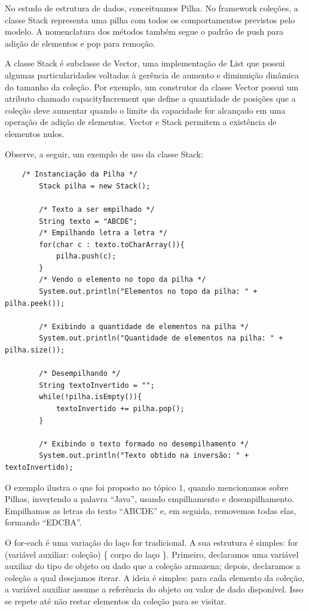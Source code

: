 \documentclass[11pt]{article}
\begin{document}
No estudo de estrutura de dados, conceituamos Pilha. No framework coleções, a classe Stack representa uma pilha com todos os comportamentos previstos pelo modelo. A nomenclatura dos métodos também segue o padrão de push para adição de elementos e pop para remoção.

A classe Stack é subclasse de Vector, uma implementação de List que possui algumas particularidades voltadas à gerência de aumento e diminuição dinâmica do tamanho da coleção. Por exemplo, um construtor da classe Vector possui um atributo chamado capacityIncrement que define a quantidade de posições que a coleção deve aumentar quando o limite da capacidade for alcançado em uma operação de adição de elementos. Vector e Stack permitem a existência de elementos nulos.

Observe, a seguir, um exemplo de uso da classe Stack:

\begin{verbatim}
    /* Instanciação da Pilha */
        Stack pilha = new Stack();

        /* Texto a ser empilhado */
        String texto = "ABCDE";
        /* Empilhando letra a letra */
        for(char c : texto.toCharArray()){
            pilha.push(c);
        }
        /* Vendo o elemento no topo da pilha */
        System.out.println("Elementos no topo da pilha: " + pilha.peek());

        /* Exibindo a quantidade de elementos na pilha */
        System.out.println("Quantidade de elementos na pilha: " + pilha.size());

        /* Desempilhando */
        String textoInvertido = "";
        while(!pilha.isEmpty()){
            textoInvertido += pilha.pop();
        }

        /* Exibindo o texto formado no desempilhamento */
        System.out.println("Texto obtido na inversão: " + textoInvertido);
\end{verbatim}

O exemplo ilustra o que foi proposto no tópico 1, quando mencionamos sobre Pilhas, invertendo a palavra “Java”, usando empilhamento e desempilhamento. Empilhamos as letras do texto “ABCDE” e, em seguida, removemos todas elas, formando “EDCBA”.

O for-each é uma variação do laço for tradicional. A sua estrutura é simples: for (variável auxiliar: coleção) \{ corpo do laço \}. Primeiro, declaramos uma variável auxiliar do tipo de objeto ou dado que a coleção armazena; depois, declaramos a coleção a qual desejamos iterar. A ideia é simples: para cada elemento da coleção, a variável auxiliar assume a referência do objeto ou valor de dado disponível. Isso se repete até não restar elementos da coleção para se visitar.
\end{document}
